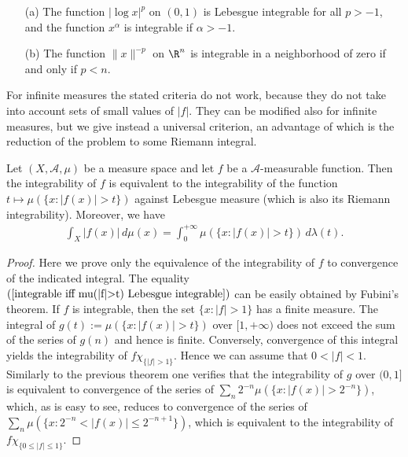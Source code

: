 \begin{example}
\mbox{}
\begin{itemize}
\item[(a)] The function $|\log x|^p$ on $(0,1)$ is Lebesgue integrable for all $p>-1$, and the function $x^\alpha$ is integrable if $\alpha>-1$.
\item[(b)] The function $\|x\|^{-p}$ on $\R^n$ is integrable in a neighborhood of zero if and only if $p<n$.
\end{itemize}
\end{example}
For infinite measures the stated criteria do not work, because they do not take into account sets of small values of $|f|$. They can be modified also for infinite measures, but we give instead a universal criterion, an advantage of which is the reduction of the problem to some Riemann integral.
\begin{theorem}
Let $(X,\mathcal{A},\mu)$ be a measure space and let $f$ be a $\mathcal{A}$-measurable function. Then the integrability of $f$ is equivalent to the integrability of the function $t\mapsto\mu(\{x:|f(x)|>t\})$ against Lebesgue measure (which is also its Riemann integrability). Moreover, we have
\begin{align}\label{integrable iff mu(|f|>t) Lebesgue integrable}
\int_X|f(x)|\,d\mu(x)=\int_{0}^{+\infty}\mu(\{x:|f(x)|>t\})\,d\lambda(t).
\end{align}
\end{theorem}
\begin{proof}
Here we prove only the equivalence of the integrability of $f$ to convergence of the indicated integral. The equality $(\ref{integrable iff mu(|f|>t) Lebesgue integrable})$ can be easily obtained by Fubini's theorem. If $f$ is integrable, then the set $\{x:|f|>1\}$ has a finite measure. The integral of $g(t):=\mu(\{x:|f(x)|>t\})$ over $[1,+\infty)$ does not exceed the sum of the series of $g(n)$ and hence is finite. Conversely, convergence of this integral yields the integrability of $f\chi_{\{|f|>1\}}$. Hence we can assume that $0<|f|<1$. Similarly to the previous theorem one verifies that the integrability of $g$ over $(0,1]$ is equivalent to convergence of the series of $\sum_n2^{-n}\mu(\{x:|f(x)|>2^{-n}\})$, which, as is easy to see, reduces to convergence of the series of $\sum_n\mu(\{x:2^{-n}<|f(x)|\leq 2^{-n+1}\})$, which is equivalent to the integrability of $f\chi_{\{0\leq|f|\leq 1\}}$.
\end{proof}
